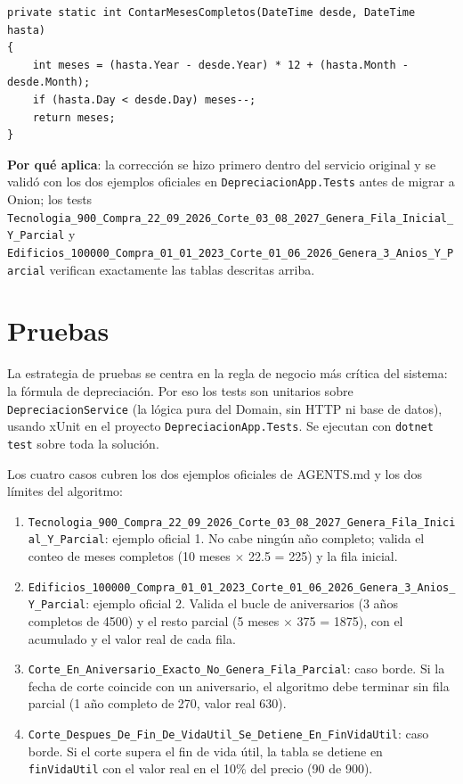\documentclass[11pt,a4paper]{article}
\begin{document}
\begin{lstlisting}[style=csharp, caption={DepreciacionService.cs — conteo de meses completos}]
private static int ContarMesesCompletos(DateTime desde, DateTime hasta)
{
    int meses = (hasta.Year - desde.Year) * 12 + (hasta.Month - desde.Month);
    if (hasta.Day < desde.Day) meses--;
    return meses;
}
\end{lstlisting}

\textbf{Por qué aplica}: la corrección se hizo primero dentro del servicio
original y se validó con los dos ejemplos oficiales en
\texttt{DepreciacionApp.Tests} antes de migrar a Onion; los tests
\texttt{Tecnologia\_900\_Compra\_22\_09\_2026\_Corte\_03\_08\_2027\_Genera\_Fila\_Inicial\_Y\_Parcial}
y \texttt{Edificios\_100000\_Compra\_01\_01\_2023\_Corte\_01\_06\_2026\_Genera\_3\_Anios\_Y\_Parcial}
verifican exactamente las tablas descritas arriba.

\section{Pruebas}

La estrategia de pruebas se centra en la regla de negocio más crítica del
sistema: la fórmula de depreciación. Por eso los tests son unitarios sobre
\texttt{DepreciacionService} (la lógica pura del Domain, sin HTTP ni base de
datos), usando xUnit en el proyecto \texttt{DepreciacionApp.Tests}. Se
ejecutan con \texttt{dotnet test} sobre toda la solución.

Los cuatro casos cubren los dos ejemplos oficiales de AGENTS.md y los dos
límites del algoritmo:

\begin{enumerate}
    \item \texttt{Tecnologia\_900\_Compra\_22\_09\_2026\_Corte\_03\_08\_2027\_Genera\_Fila\_Inicial\_Y\_Parcial}:
    ejemplo oficial 1. No cabe ningún año completo; valida el conteo de meses
    completos (10 meses $\times$ 22.5 = 225) y la fila inicial.
    \item \texttt{Edificios\_100000\_Compra\_01\_01\_2023\_Corte\_01\_06\_2026\_Genera\_3\_Anios\_Y\_Parcial}:
    ejemplo oficial 2. Valida el bucle de aniversarios (3 años completos de
    4500) y el resto parcial (5 meses $\times$ 375 = 1875), con el acumulado y
    el valor real de cada fila.
    \item \texttt{Corte\_En\_Aniversario\_Exacto\_No\_Genera\_Fila\_Parcial}:
    caso borde. Si la fecha de corte coincide con un aniversario, el algoritmo
    debe terminar sin fila parcial (1 año completo de 270, valor real 630).
    \item \texttt{Corte\_Despues\_De\_Fin\_De\_VidaUtil\_Se\_Detiene\_En\_FinVidaUtil}:
    caso borde. Si el corte supera el fin de vida útil, la tabla se detiene en
    \texttt{finVidaUtil} con el valor real en el 10\% del precio (90 de 900).
\end{enumerate}
\end{document}
